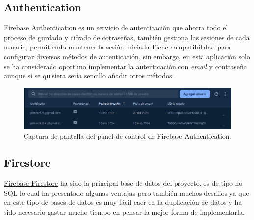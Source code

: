 \subsection{Authentication}
\href{https://firebase.google.com/docs/auth/}{Firebase Authentication} es un servicio de autenticación que ahorra todo el proceso de gurdado y cifrado de cotraseñas, también gestiona las sesiones de cada usuario, permitiendo mantener la sesión iniciada.Tiene compatibilidad para configurar diversos métodos de autenticación, sin embargo, en esta aplicación solo se ha considerado oportuno implementar la autenticación con \textit{email} y contraseña aunque si se quisiera sería sencillo añadir otros métodos.
\begin{figure}[h]
    \centering
    \includegraphics[width = 1\textwidth]{Imagenes/Fuentes/ejemplo_auth.png}
    \caption{Captura de pantalla del panel de control de Firebase Authentication.}
    \label{fig:ejemplo_auth}
\end{figure}
\hypertarget{subsec:firestore}{}
\subsection{Firestore} 
\href{https://firebase.google.com/docs/firestore/}{Firebase Firestore} ha sido la principal base de datos del proyecto, es de tipo no SQL lo cual ha presentado algunas ventajas pero también muchos desafios ya que en este tipo de bases de datos es muy fácil caer en la duplicación de datos y ha sido necesario gastar mucho tiempo en pensar la mejor forma de implementarla. 

